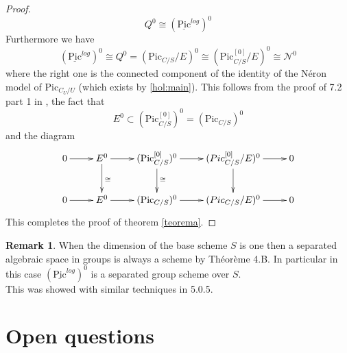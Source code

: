 \documentclass{amsart}
\theoremstyle{definition}
\newtheorem{rmk}[thm]{Remark}
\numberwithin{equation}{section}
\begin{document}
\begin{proof}
$$
Q^0\cong ({\underline{\mbox{Pic}}^{log}})^0
$$
\noindent 
Furthermore we have
$$
({\underline{\mbox{Pic}}^{log}})^0\cong Q^0=({\mbox{Pic}}_{C/S}/E)^0\cong ({\mbox{Pic}}_{C/S}^{[0]}/E)^0\cong \mathcal{N}^0
$$
\noindent where the right one is the connected component of the identity of the N\'eron model of ${\mbox{Pic}}_{C_U/U}$ (which exists by \ref{hol:main}). This follows from the proof of 7.2 part 1 in \cite{hol}, the fact that 
$$
E^0\subset ({\mbox{Pic}}_{C/S}^{[0]})^0=({\mbox{Pic}}_{C/S})^0
$$
\noindent and the diagram
$$
\xymatrix{
    {0}\ar[r] & {E^0}\ar[r]\ar[d]^{\cong}& {({\mbox{Pic}}_{C/S}^{[0]})^0}\ar[r]\ar[d]^{\cong} & {(Pic_{C/S}^{[0]}/E)^0}\ar[r]\ar[d] & {0}\\
    {0}\ar[r] & {E^0}\ar[r]& {({\mbox{Pic}}_{C/S})^0}\ar[r] & {(Pic_{C/S}/E)^0}\ar[r] & {0}\\
}
$$
This completes the proof of theorem \ref{teorema}.
\end{proof}
\begin{rmk}
When the dimension of the base scheme $S$ is one then a separated algebraic space in groups is always a scheme by \cite{anan} Th\'eor\`eme 4.B.
In particular in this case $({\underline{\mbox{Pic}}^{log}})^0$ is a separated group scheme over $S$.\\ This was showed with similar techniques in \cite{b14} 5.0.5.
\end{rmk}

\section{Open questions}
\end{document}

